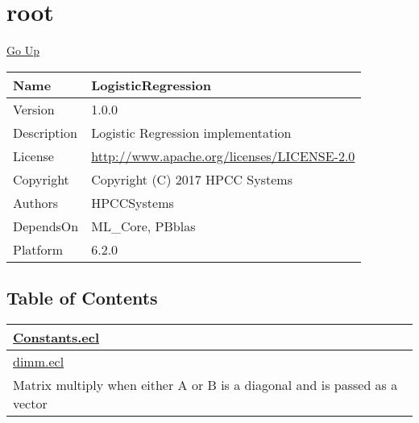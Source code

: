 \chapter*{\color{headtoc} root}
\hypertarget{ecldoc:toc:root}{}
\hyperlink{ecldoc:toc:}{Go Up}

\begin{tabularx}{\textwidth}{|l|X|}
\hline
Name &
LogisticRegression
 \\
\hline
Version &
1.0.0
 \\
\hline
Description &
Logistic Regression implementation
 \\
\hline
License &
\url{http://www.apache.org/licenses/LICENSE-2.0}
 \\
\hline
Copyright &
Copyright (C) 2017 HPCC Systems
 \\
\hline
Authors &
HPCCSystems
 \\
\hline
DependsOn &
ML\_Core, PBblas
 \\
\hline
Platform &
6.2.0
 \\
\hline
\end{tabularx}

\section*{Table of Contents}
{\renewcommand{\arraystretch}{1.5}
\begin{longtable}{|p{\textwidth}|}
\hline
\hyperlink{ecldoc:toc:Constants}{Constants.ecl} \\
\hline
\hyperlink{ecldoc:toc:dimm}{dimm.ecl} \\
Matrix multiply when either A or B is a diagonal and is passed as a vector \\
\hline
\end{longtable}
}



